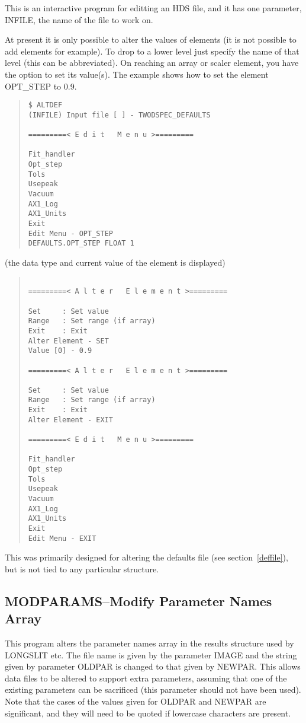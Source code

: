 This is an interactive program for editting an HDS file, and it has one
parameter, INFILE, the name of the file to work on.

At present it is only possible to alter the values of elements (it is
not possible to add elements for example).
To drop to a lower level just specify the name of that level (this can
be abbreviated).
On reaching an array or scaler element, you have the option to set its
value(s).
The example shows how to set the element OPT\_STEP to 0.9.
\begin{quote}\begin{verbatim}
$ ALTDEF
(INFILE) Input file [ ] - TWODSPEC_DEFAULTS

=========< E d i t   M e n u >=========

Fit_handler
Opt_step
Tols
Usepeak
Vacuum
AX1_Log
AX1_Units
Exit
Edit Menu - OPT_STEP
DEFAULTS.OPT_STEP FLOAT 1
\end{verbatim}\end{quote}
(the data type and current value of the element is displayed)
\begin{quote}\begin{verbatim}

=========< A l t e r   E l e m e n t >=========

Set     : Set value
Range   : Set range (if array)
Exit    : Exit
Alter Element - SET
Value [0] - 0.9

=========< A l t e r   E l e m e n t >=========

Set     : Set value
Range   : Set range (if array)
Exit    : Exit
Alter Element - EXIT

=========< E d i t   M e n u >=========

Fit_handler
Opt_step
Tols
Usepeak
Vacuum
AX1_Log
AX1_Units
Exit
Edit Menu - EXIT
\end{verbatim}\end{quote}
This was primarily designed for altering the defaults file (see
section~\ref{deffile}), but is not tied to any particular structure.

\subsection{MODPARAMS--Modify Parameter Names Array}

This program alters the parameter names array in the results structure
used by LONGSLIT etc.
The file name is given by the parameter IMAGE and the string given by
parameter OLDPAR is changed to that given by NEWPAR.
This allows data files to be altered to support extra parameters,
assuming that one of the existing parameters can be sacrificed (this
parameter should not have been used).
Note that the cases of the values given for OLDPAR and NEWPAR are
significant, and they will need to be quoted if lowercase characters are
present.


